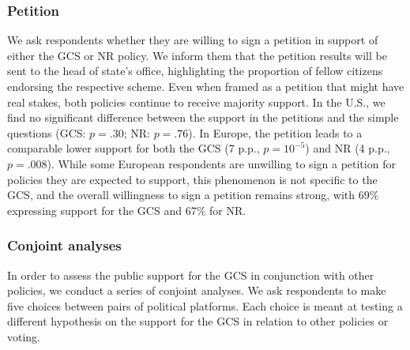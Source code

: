 \begin{bibunit}
\subsubsection{Petition}\label{subsubsec:petition} %

We ask respondents whether they are willing to sign a petition in support of either the GCS or NR policy. We inform them that the petition results will be sent to the head of state's office, highlighting the proportion of fellow citizens endorsing the respective scheme. Even when framed as a petition that might have real stakes, both policies continue to receive majority support. In the U.S., we find no significant difference between the support in the %
petitions and the simple questions (GCS: $p=.30$; NR: $p=.76$). %
In Europe, the petition leads to a comparable lower support for both the GCS (7 p.p., $p=10^{-5}$) and NR (4 p.p., $p = .008$). While some European respondents are unwilling to sign a petition for policies they are expected to support, this phenomenon is not specific to the GCS, and the overall willingness to sign a %
petition remains strong, with 69\% expressing support for the GCS and 67\% for NR.

\subsubsection{Conjoint analyses}\label{subsubsec:conjoint} %

In order to assess the public support for the GCS in conjunction with other policies, we conduct a series of conjoint analyses. We ask respondents to make five choices between pairs of political platforms. Each choice is meant at testing a different hypothesis on the support for the GCS in relation to other policies or voting.


\end{bibunit}
